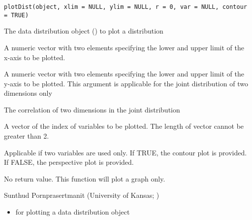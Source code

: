 \documentclass[a4paper]{book}
\begin{document}
%
\begin{Usage}
\begin{verbatim}
plotDist(object, xlim = NULL, ylim = NULL, r = 0, var = NULL, contour = TRUE)
\end{verbatim}
\end{Usage}
%
\begin{Arguments}
\begin{ldescription}
\item[\code{object}] 
The data distribution object () to plot a distribution 

\item[\code{xlim}] 
A numeric vector with two elements specifying the lower and upper limit of the x-axis to be plotted. 

\item[\code{ylim}] 
A numeric vector with two elements specifying the lower and upper limit of the y-axis to be plotted. This argument is applicable for the joint distribution of two dimensions only

\item[\code{r}] 
The correlation of two dimensions in the joint distribution

\item[\code{var}] 
A vector of the index of variables to be plotted. The length of vector cannot be greater than 2.

\item[\code{contour}] 
Applicable if two variables are used only. If TRUE, the contour plot is provided. If FALSE, the perspective plot is provided.

\end{ldescription}
\end{Arguments}
%
\begin{Value}
No return value. This function will plot a graph only.
\end{Value}
%
\begin{Author}\relax
Sunthud Pornprasertmanit (University of Kansas; )
\end{Author}
%
\begin{SeeAlso}\relax
\begin{itemize}

\item {} for plotting a data distribution object

\end{itemize}

\end{SeeAlso}
\end{document}
